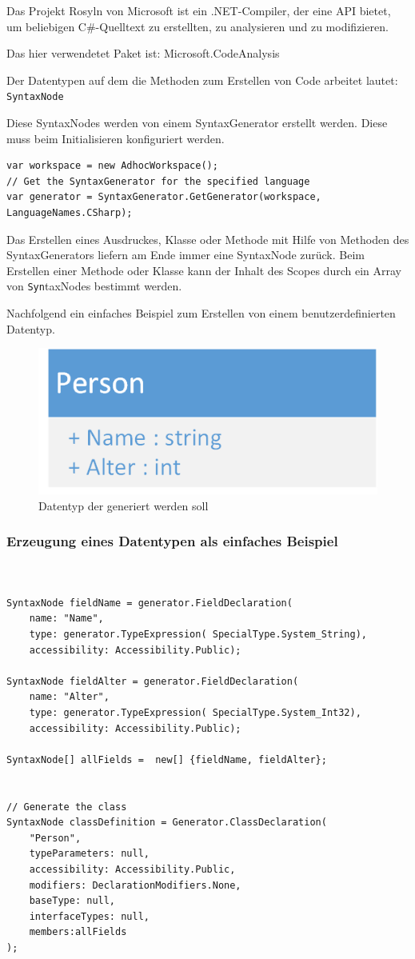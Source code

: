 Das Projekt Rosyln von Microsoft ist ein .NET-Compiler, der eine API bietet, um beliebigen C\#-Quelltext zu erstellten,
zu analysieren und zu modifizieren.

Das hier verwendetet Paket ist: Microsoft.CodeAnalysis

Der Datentypen auf dem die Methoden zum Erstellen von Code arbeitet lautet:
\texttt{SyntaxNode} 

Diese SyntaxNodes werden von einem SyntaxGenerator erstellt werden.
Diese muss beim Initialisieren konfiguriert werden.

\begin{lstlisting}[caption=SyntaxGenerator für C\# erhalten]
var workspace = new AdhocWorkspace();
// Get the SyntaxGenerator for the specified language
var generator = SyntaxGenerator.GetGenerator(workspace, LanguageNames.CSharp);
\end{lstlisting}


Das Erstellen eines Ausdruckes, Klasse oder Methode mit Hilfe von Methoden
des SyntaxGenerators liefern am Ende immer eine SyntaxNode zurück.
Beim Erstellen einer Methode oder Klasse kann der Inhalt des Scopes durch
ein Array von \texttt{Syn}taxNodes bestimmt werden.

Nachfolgend ein einfaches Beispiel zum Erstellen von einem
benutzerdefinierten Datentyp.

\begin{figure}[H]
	\centering
	\includegraphics[width=0.4\linewidth]{./img/Person.png}
	\caption{Datentyp der generiert werden soll}
\end{figure}


	\subsubsection{Erzeugung eines Datentypen als einfaches Beispiel}

	
	\begin{lstlisting}[caption=Erzeugung einer Person-Klasse mit Roslyn]


SyntaxNode fieldName = generator.FieldDeclaration(
	name: "Name",
	type: generator.TypeExpression( SpecialType.System_String),
	accessibility: Accessibility.Public);

SyntaxNode fieldAlter = generator.FieldDeclaration(
	name: "Alter",
	type: generator.TypeExpression( SpecialType.System_Int32),
	accessibility: Accessibility.Public);

SyntaxNode[] allFields =  new[] {fieldName, fieldAlter};


// Generate the class
SyntaxNode classDefinition = Generator.ClassDeclaration(
	"Person", 
	typeParameters: null,
	accessibility: Accessibility.Public,
	modifiers: DeclarationModifiers.None,
	baseType: null,
	interfaceTypes: null,
	members:allFields
);
	\end{lstlisting}
	
